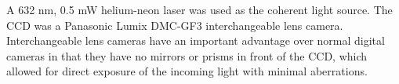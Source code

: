 
%
%
%
\clearpage


A 632 nm, 0.5 mW helium-neon laser was used as the coherent light
source.
The CCD was a Panasonic Lumix DMC-GF3 interchangeable lens camera.
Interchangeable lens cameras have an important advantage over normal digital
cameras in that they have no mirrors or prisms in front of
the CCD\@, which allowed for direct exposure of the incoming light with minimal
aberrations.

